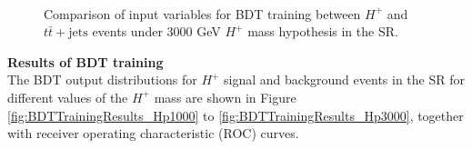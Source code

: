 \begin{description}
\begin{figure}[H]
{        \label{fig:SOVERB_leadingTop_mass_Hp3000_Contained80_DL1r_70}
      }
      \\
      \caption{Comparison of input variables for BDT training between $H^{+}$ and $t\bar{t}+\text{jets}$ events under 3000 GeV $H^{+}$ mass hypothesis in the SR.}
      \label{fig:SOVERB_Hp3000_Contained80_DL1r_70}
    \end{figure}

    \item{\textbf{Results of BDT training}}\mbox{}\\
    The BDT output distributions for $H^{+}$ signal and background events in the SR for different values of the $H^+$ mass are shown in Figure \ref{fig:BDTTrainingResults_Hp1000} to \ref{fig:BDTTrainingResults_Hp3000}, together with receiver operating characteristic (ROC) curves.


\end{description}
